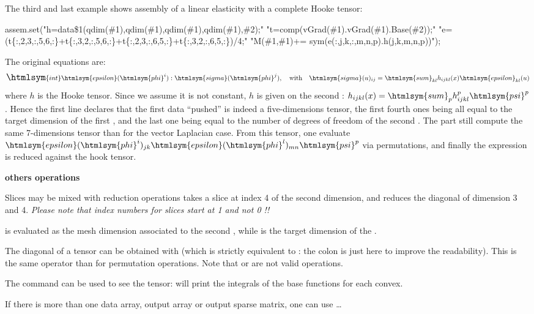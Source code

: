 \documentclass[11pt,a4paper]{article}
\newcommand{\text}[1]{\mathrm{#1}}
\newcommand{\varepsilon}{\htmlsym{epsilon}}
\newcommand{\phi}{\htmlsym{phi}}
\newcommand{\varphi}{\htmlsym{phi}}
\newcommand{\psi}{\htmlsym{psi}}
\newcommand{\sigma}{\htmlsym{sigma}}
\newcommand{\sum}{\htmlsym{sum}}
\newcommand{\int}{{\Large\htmlsym{int}}}
\begin{document}
The third and last example shows assembly of a linear elasticity with a complete Hooke tensor:
\begin{cppcode}
 assem.set("h=data\$1(qdim(\#1),qdim(\#1),qdim(\#1),qdim(\#1),\#2);"
           "t=comp(vGrad(\#1).vGrad(\#1).Base(\#2));"
           "e=(t\{:,2,3,:,5,6,:\}+t\{:,3,2,:,5,6,:\}+t\{:,2,3,:,6,5,:\}+t\{:,3,2,:,6,5,:\})/4;"
           "M(\#1,\#1)+= sym(e(:,j,k,:,m,n,p).h(j,k,m,n,p))");
\end{cppcode}
The original equations are:
\begin{equation*}\int\varepsilon(\varphi^i):\sigma(\phi^j),\quad\text{with}\quad
\sigma(u)_{ij}=\sum_{kl}h_{ijkl}(x)\varepsilon_{kl}(u)\end{equation*}
where $h$ is the Hooke tensor.
Since we assume it is not constant, $h$ is given on the second : $h_{ijkl}(x)=\sum_ph_{ijkl}^p\psi^p$.  Hence the first line
declares that the first data ``pushed'' is indeed a five-dimensions
tensor, the first fourth ones being all equal to the target dimension
of the first , and the last one being equal to the
number of degrees of freedom of the second .  The  part still compute the same 7-dimensions tensor than for the
vector Laplacian case.  From this tensor, one evaluate
$\varepsilon(\varphi^i)_{jk}\varepsilon(\phi^l)_{mn}\psi^p$ via permutations, and finally the
expression is reduced against the hook tensor.

{\bf others operations}

Slices may be mixed with reduction operations  takes a slice at index 4 of the second dimension, and reduces the diagonal of dimension 3 and 4. {\em Please note that index numbers for slices start at 1 and not 0 !!} 

 is evaluated as the mesh dimension associated to the second , while  is the target dimension of the .

The diagonal of a tensor can be obtained with  (which is strictly equivalent to : the colon is just here to improve the readability). This is the same operator than for permutation operations. Note that  or  are not valid operations. 

The  command can be used to see the tensor:  will print the integrals of the base functions for each convex.

If there is more than one data array, output array  or output sparse matrix, one can use \ldots
\end{document}

